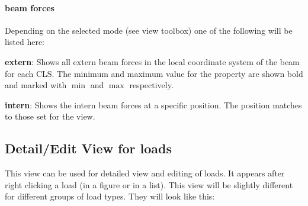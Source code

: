 \documentclass[a4paper,11pt]{report}
\begin{document}
\paragraph{beam forces}

Depending on the selected mode (see view toolbox) one of the following will be listed here:
\begin{trivlist}
\leftskip=1cm
\item[] \textbf{extern}: Shows all extern beam forces in the local coordinate system of the beam for each CLS. The minimum and maximum value for the property are shown bold and marked with $\min$ and $\max$ respectively.
\item[] \textbf{intern}: Shows the intern beam forces at a specific position. The position matches to those set for the view.
\end{trivlist}




\subsection{Detail/Edit View for loads}
\label{sec:loaddetail}

This view can be used for detailed view and editing of loads. It appears after right clicking a load (in a figure or in a list). This view will be slightly different for different groups of load types. They will look like this:
\end{document}
